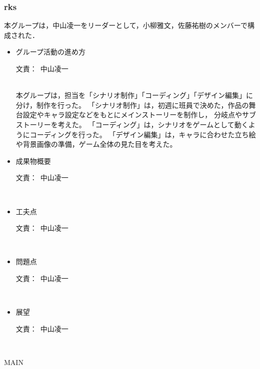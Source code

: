 \documentclass[a4paper]{jarticle}
\newcommand{\resp}[1]{\begin{flushright}文責：~#1\end{flushright}~\\}
\begin{document}
\fi

\subsubsection{rks}
    
    本グループは，中山凌一をリーダーとして，小柳雅文，佐藤祐樹のメンバーで構成された．

    \begin{itemize}
        \item グループ活動の進め方
        
        \resp{中山凌一}

        本グループは，担当を「シナリオ制作」「コーディング」「デザイン編集」に分け，制作を行った。
        「シナリオ制作」は，初週に班員で決めた，作品の舞台設定やキャラ設定などをもとにメインストーリーを制作し，
        分岐点やサブストーリーを考えた。
        「コーディング」は，シナリオをゲームとして動くようにコーディングを行った。
        「デザイン編集」は，キャラに合わせた立ち絵や背景画像の準備，ゲーム全体の見た目を考えた。

        \item 成果物概要
        
        \resp{中山凌一}


        \item 工夫点
        
        \resp{中山凌一}


        \item 問題点
        
        \resp{中山凌一}


        \item 展望
        
        \resp{中山凌一}


    \end{itemize}

\expandafter\ifx\csname MAIN \endcsname\relax
  
\end{document}
